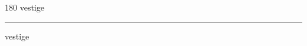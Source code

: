 
\begin{frame}
\begin{center}
\begin{turn}{180}
{\fontsize{2.5cm}{1em}\selectfont vestige}
\end{turn}
\vspace{1em}\par  
\hrule
\vspace{1em}\par  
{\fontsize{2.5cm}{1em}\selectfont vestige}
\end{center}
\end{frame}

